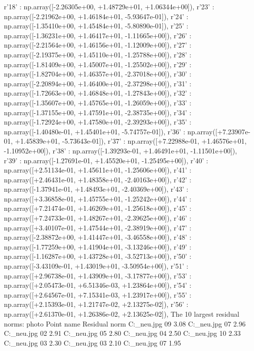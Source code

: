 r'18' : np.array([-2.26305e+00, +1.48729e+01, +1.06344e+00]),
r'23' : np.array([-2.21962e+00, +1.46184e+01, -5.93647e-01]),
r'24' : np.array([-1.35410e+00, +1.45484e+01, -5.80890e-01]),
r'25' : np.array([-1.36231e+00, +1.46417e+01, -1.11665e+00]),
r'26' : np.array([-2.21564e+00, +1.46156e+01, -1.12009e+00]),
r'27' : np.array([-2.19375e+00, +1.45110e+01, -1.25788e+00]),
r'28' : np.array([-1.81409e+00, +1.45007e+01, -1.25502e+00]),
r'29' : np.array([-1.82704e+00, +1.46357e+01, -2.37018e+00]),
r'30' : np.array([-2.20894e+00, +1.46400e+01, -2.37298e+00]),
r'31' : np.array([-1.72663e+00, +1.46848e+01, -1.27843e+00]),
r'32' : np.array([-1.35607e+00, +1.45765e+01, -1.26059e+00]),
r'33' : np.array([-1.37155e+00, +1.47591e+01, -2.38735e+00]),
r'34' : np.array([-1.72924e+00, +1.47580e+01, -2.39293e+00]),
r'35' : np.array([-1.40480e-01, +1.45401e+01, -5.74757e-01]),
r'36' : np.array([+7.23907e-01, +1.45839e+01, -5.73643e-01]),
r'37' : np.array([+7.22988e-01, +1.46576e+01, -1.10952e+00]),
r'38' : np.array([-1.39293e-01, +1.46491e+01, -1.11501e+00]),
r'39' : np.array([-1.27691e-01, +1.45520e+01, -1.25495e+00]),
r'40' : np.array([+2.51134e-01, +1.45611e+01, -1.25606e+00]),
r'41' : np.array([+2.46431e-01, +1.48358e+01, -2.40163e+00]),
r'42' : np.array([-1.37941e-01, +1.48493e+01, -2.40369e+00]),
r'43' : np.array([+3.36858e-01, +1.45755e+01, -1.25242e+00]),
r'44' : np.array([+7.21474e-01, +1.46269e+01, -1.25618e+00]),
r'45' : np.array([+7.24733e-01, +1.48267e+01, -2.39625e+00]),
r'46' : np.array([+3.40107e-01, +1.47544e+01, -2.38919e+00]),
r'47' : np.array([-2.38872e+00, +1.41447e+01, -3.46558e+00]),
r'48' : np.array([-1.77259e+00, +1.41904e+01, -3.13246e+00]),
r'49' : np.array([-1.16287e+00, +1.43728e+01, -3.52713e+00]),
r'50' : np.array([-3.43109e-01, +1.43019e+01, -3.50954e+00]),
r'51' : np.array([+2.96738e-01, +1.43909e+01, -3.17877e+00]),
r'53' : np.array([+2.05473e-01, +6.51346e-03, +1.23864e+00]),
r'54' : np.array([+2.64567e-01, +7.15341e-03, +1.23917e+00]),
r'55' : np.array([+2.15393e-01, +1.21747e-02, +2.13275e-02]),
r'56' : np.array([+2.61370e-01, +1.26386e-02, +2.13625e-02]),
The 10 largest residual norms:
photo	Point name	Residual norm
C:\Users\Clemens\Desktop\fotos_neu\4.jpg	09	3.08
C:\Users\Clemens\Desktop\fotos_neu\4.jpg	07	2.96
C:\Users\Clemens\Desktop\fotos_neu\1.jpg	02	2.91
C:\Users\Clemens\Desktop\fotos_neu\4.jpg	05	2.80
C:\Users\Clemens\Desktop\fotos_neu\3.jpg	04	2.50
C:\Users\Clemens\Desktop\fotos_neu\4.jpg	10	2.33
C:\Users\Clemens\Desktop\fotos_neu\1.jpg	03	2.30
C:\Users\Clemens\Desktop\fotos_neu\3.jpg	03	2.10
C:\Users\Clemens\Desktop\fotos_neu\1.jpg	07	1.95
